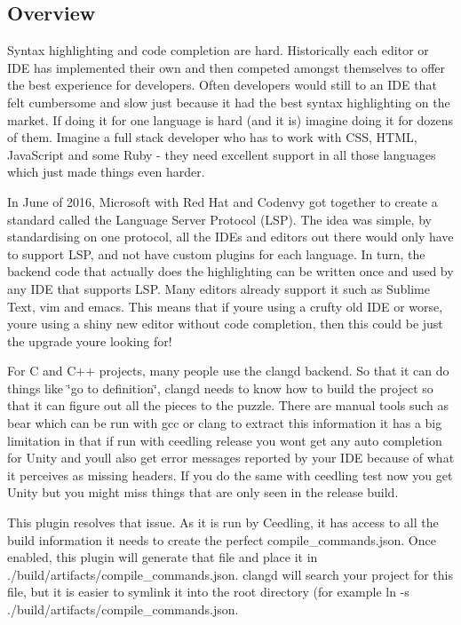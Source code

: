 \subsection*{Overview}

Syntax highlighting and code completion are hard. Historically each editor or I\+DE has implemented their own and then competed amongst themselves to offer the best experience for developers. Often developers would still to an I\+DE that felt cumbersome and slow just because it had the best syntax highlighting on the market. If doing it for one language is hard (and it is) imagine doing it for dozens of them. Imagine a full stack developer who has to work with C\+SS, H\+T\+ML, Java\+Script and some Ruby -\/ they need excellent support in all those languages which just made things even harder.

In June of 2016, Microsoft with Red Hat and Codenvy got together to create a standard called the Language Server Protocol (L\+SP). The idea was simple, by standardising on one protocol, all the I\+D\+Es and editors out there would only have to support L\+SP, and not have custom plugins for each language. In turn, the backend code that actually does the highlighting can be written once and used by any I\+DE that supports L\+SP. Many editors already support it such as Sublime Text, vim and emacs. This means that if you\textquotesingle{}re using a crufty old I\+DE or worse, you\textquotesingle{}re using a shiny new editor without code completion, then this could be just the upgrade you\textquotesingle{}re looking for!

For C and C++ projects, many people use the {\ttfamily clangd} backend. So that it can do things like \char`\"{}go to definition\char`\"{}, {\ttfamily clangd} needs to know how to build the project so that it can figure out all the pieces to the puzzle. There are manual tools such as {\ttfamily bear} which can be run with {\ttfamily gcc} or {\ttfamily clang} to extract this information it has a big limitation in that if run with {\ttfamily ceedling release} you won\textquotesingle{}t get any auto completion for Unity and you\textquotesingle{}ll also get error messages reported by your I\+DE because of what it perceives as missing headers. If you do the same with {\ttfamily ceedling test} now you get Unity but you might miss things that are only seen in the release build.

This plugin resolves that issue. As it is run by Ceedling, it has access to all the build information it needs to create the perfect {\ttfamily compile\+\_\+commands.\+json}. Once enabled, this plugin will generate that file and place it in {\ttfamily ./build/artifacts/compile\+\_\+commands.json}. {\ttfamily clangd} will search your project for this file, but it is easier to symlink it into the root directory (for example {\ttfamily ln -\/s ./build/artifacts/compile\+\_\+commands.json}.

